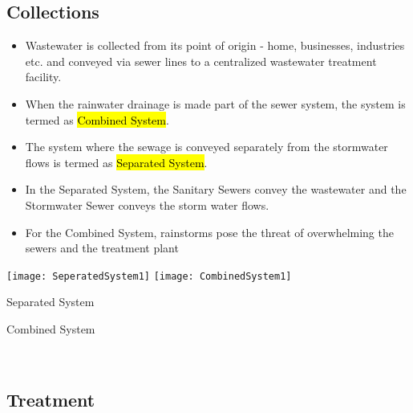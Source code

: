 \subsection{Collections}

\begin{itemize}
\item Wastewater is collected from its point of origin - home, businesses, industries etc. and conveyed via sewer lines to a centralized wastewater treatment facility.  
\item When the rainwater drainage is made part of the sewer system, the system is termed as \hl{Combined System}.  
\item The system where the sewage is conveyed separately from the stormwater flows is termed as \hl{Separated System}.  
\item In the Separated System, the Sanitary Sewers convey the wastewater and the Stormwater Sewer conveys the storm water flows.  
\item For the Combined System, rainstorms pose the threat of overwhelming the sewers and the treatment plant
\end{itemize}  
\begin{center}
\texttt{[image: SeperatedSystem1]} \hspace{1 cm} \texttt{[image: CombinedSystem1]}
\end{center}
			\hspace{2.6cm} Separated System \hspace{3.2cm} \parbox{\textwidth}{Combined System}\\

\subsection{Treatment}

